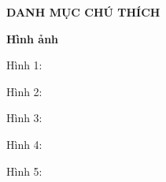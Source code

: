 
\newpage
\changefontsizes{16pt}
\centerline{\textbf{DANH MỤC CHÚ THÍCH}}


\vspace{1cm}
\changefontsizes{14pt}
\setlength{\parindent}{0cm}
\bigskip
\textbf{Hình ảnh}

\smallskip
\setlength{\parindent}{1cm}
\changefontsizes{13pt}
Hình 1:

\smallskip
Hình 2: 


\smallskip
Hình 3: 

\smallskip
Hình 4: 

\smallskip
Hình 5: 
